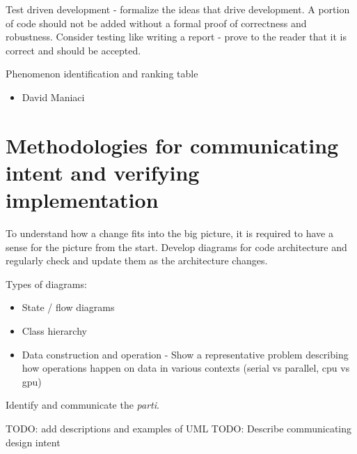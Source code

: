 \documentclass[]{nrel}
\begin{document}
Test driven development - formalize the ideas that drive development.
A portion of code should not be added without a formal proof of correctness and robustness.
Consider testing like writing a report - prove to the reader that it is correct and should be accepted.

Phenomenon identification and ranking table
\begin{itemize}
\item David Maniaci

\end{itemize}


\chapter{Methodologies for communicating intent and verifying implementation}
To understand how a change fits into the big picture, it is required to have a sense for the picture from the start.
Develop diagrams for code architecture and regularly check and update them as the architecture changes.

Types of diagrams:
\begin{itemize}
\item State / flow diagrams

\item Class hierarchy

\item Data construction and operation - Show a representative problem describing how operations happen on data in various contexts (serial vs parallel, cpu vs gpu)

\end{itemize}

Identify and communicate the \textit{parti}.

TODO: add descriptions and examples of UML
TODO: Describe communicating design intent










\end{document}

